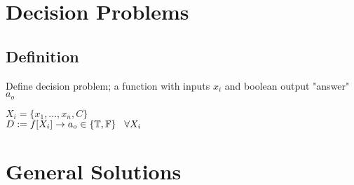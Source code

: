 \documentclass[11pt]{article}
\def \loop {\ensuremath{\rotatebox[origin=c]{-90}{$\circlearrowright$}}}
\def \nestedloop {\ensuremath{\rotatebox[origin=c]{-90}{$\circlearrowright$}}^n}
\begin{document}
















\newpage
\section{Decision Problems}

\subsection{Definition}
Define decision problem; a function with inputs $x_i$ and boolean output "answer" $a_o$
\begin{center}
$
X_i = \{x_1,...,x_n,C\}
$
\\ \vspace{2mm}
$
D := f \lbrack X_i \rbrack \rightarrow a_{o} \in \{\mathbb{T}, \mathbb{F}\} \hspace{3mm} \forall X_i
$
\end{center}







\section{General Solutions}
\end{document}
